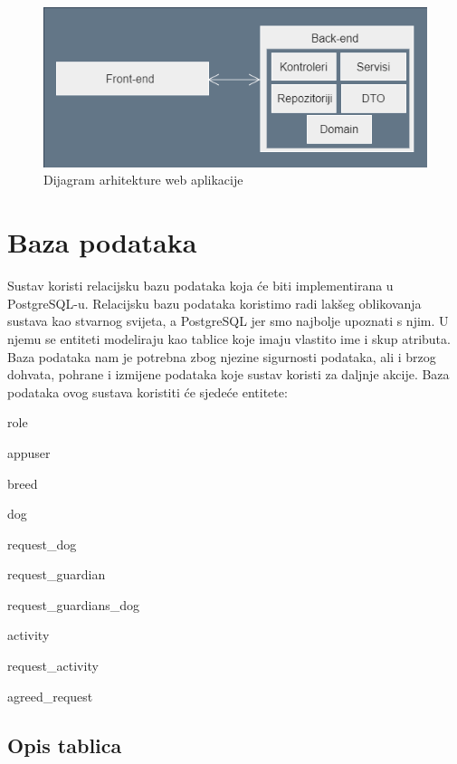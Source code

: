		\begin{figure}[htb]
			\centering
			\includegraphics[width=14cm]{slike/Arhitektura}
			\caption{Dijagram arhitekture web aplikacije} 
			\label{fig:arhitektura-dijagram}
		\end{figure}
		
		\eject
				
		\section{Baza podataka}
			
			Sustav koristi relacijsku bazu podataka koja će biti implementirana u PostgreSQL-u. Relacijsku bazu podataka koristimo radi lakšeg oblikovanja sustava kao stvarnog svijeta, a PostgreSQL jer smo najbolje upoznati s njim. U njemu se entiteti modeliraju kao tablice koje imaju vlastito ime i skup atributa.\\
			Baza podataka nam je potrebna zbog njezine sigurnosti podataka, ali i brzog dohvata, pohrane i izmijene podataka koje sustav koristi za daljnje akcije.
			Baza podataka ovog sustava koristiti će sjedeće entitete:
			\begin{packed_item}
				\item role
				\item appuser
				\item breed
				\item dog
				\item request\_dog
				\item request\_guardian
				\item request\_guardians\_dog
				\item activity
				\item request\_activity
				\item agreed\_request
				
			\end{packed_item}
			
		
			\subsection{Opis tablica}
			
